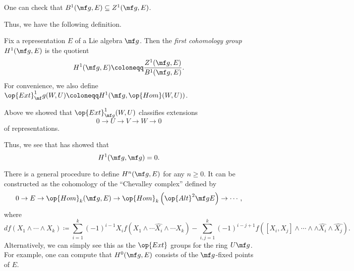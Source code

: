 \documentclass[../notes.tex]{subfiles}
\begin{document}
\begin{remark}
	One can check that $B^1(\mf g,E)\subseteq Z^1(\mf g,E)$.
\end{remark}
Thus, we have the following definition.
\begin{defihelper}[$H^1(\mf g,E)$] 
	Fix a representation $E$ of a Lie algebra $\mf g$. Then the \textit{first cohomology group} $H^1(\mf g,E)$ is the quotient
	\[H^1(\mf g,E)\coloneqq\frac{Z^1(\mf g,E)}{B^1(\mf g,E)}.\]
	For convenience, we also define $\op{Ext}^1_\mf g(W,U)\coloneqq H^1(\mf g,\op{Hom}(W,U))$.
\end{defihelper}
\begin{example}
	Above we showed that $\op{Ext}^1_{\mf g}(W,U)$ classifies extensions
	\[0\to U\to V\to W\to0\]
	of representations.
\end{example}
\begin{example}
	Thus, we see that  has showed that
	\[H^1(\mf g,\mf g)=0.\]
\end{example}
\begin{remark}
	There is a general procedure to define $H^n(\mf g,E)$ for any $n\ge0$. It can be constructed as the cohomology of the ``Chevalley complex'' defined by
	\[0\to E\to\op{Hom}_k(\mf g,E)\to\op{Hom}_k\left(\op{Alt}^2\mf gE\right)\to\cdots,\]
	where
	\[df(X_1\land\cdots\land X_k)\coloneqq\sum_{i=1}^k(-1)^{i-1}X_i f(X_1\land\cdots\widehat{X_i}\land\cdots X_k)-\sum_{i,j=1}^k(-1)^{i-j+1}f([X_i,X_j]\land\cdots\land\land\widehat{X_i}\land\widehat{X_j}).\]
	Alternatively, we can simply see this as the $\op{Ext}$ groups for the ring $U\mf g$. For example, one can compute that $H^0(\mf g,E)$ consists of the $\mf g$-fixed points of $E$.
\end{remark}
\end{document}
